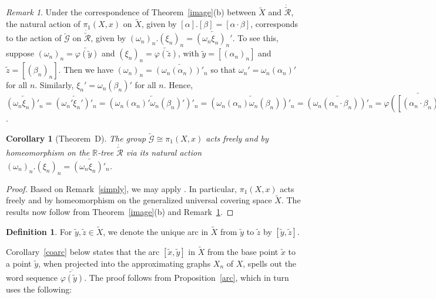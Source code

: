 \documentclass{amsart}
\newtheorem{corollary}[theorem]{Corollary}
\theoremstyle{definition}
\newtheorem{definition}[theorem]{Definition}
\theoremstyle{remark}
\newtheorem{remark}[theorem]{Remark}
\numberwithin{equation}{section}
\begin{document}
\begin{remark} \label{action} Under the correspondence of Theorem~\ref{image}(b) between $\tilde{X}$ and $\dot{\overleftarrow{\mathcal R}}$, the natural action of $\pi_1(X,x)$ on $\tilde{X}$, given  by $[\alpha].[\beta]=[\alpha\cdot\beta]$, corresponds to the action of $\overleftarrow{\mathcal G}$ on $\dot{\overleftarrow{\mathcal R}}$, given by $(\omega_n)_n.(\xi_n)_n=\overleftarrow{(\omega_n\xi_n)_n'}$. To see this, suppose $(\omega_n)_n=\overleftarrow{\varphi(\tilde{y})}$ and $(\xi_n)_n=\overleftarrow{\varphi(\tilde{z})}$, with $\tilde{y}=[(\alpha_n)_n]$ and $\tilde{z}=[(\beta_n)_n]$. Then  we have $(\omega_n)_n=\overleftarrow{(\omega_n(\alpha_n))'_n}$ so that $\omega_n'=\omega_n(\alpha_n)'$ for all $n$.
Similarly, $\xi_n'=\omega_n(\beta_n)'$ for all $n$. Hence, $\overleftarrow{(\omega_n\xi_n)'_n}=\overleftarrow{(\omega_n'\xi_n')'_n}=\overleftarrow{(\omega_n(\alpha_n)'\omega_n(\beta_n)')'_n}=
\overleftarrow{(\omega_n(\alpha_n)\omega_n(\beta_n))'_n}=\overleftarrow{(\omega_n(\alpha_n\cdot \beta_n))'_n}=\overleftarrow{\varphi([(\alpha_n\cdot\beta_n)_n])}
=\overleftarrow{\varphi([(\alpha_n)_n].[(\beta_n)_n])}
=\overleftarrow{\varphi(\tilde{y}.\tilde{z})}$.
\end{remark}

\begin{corollary}[Theorem~D]\label{ThmD}
The group $\overleftarrow{\mathcal G}\cong \pi_1(X,x)$ acts freely and by homeomorphism on the $\mathbb{R}$-tree $\dot{\overleftarrow{\mathcal R}}$ via its natural action $(\omega_n)_n.(\xi_n)_n=\overleftarrow{(\omega_n \xi_n)'_n}$.
\end{corollary}

\begin{proof} Based on Remark~\ref{simply}, we may apply \cite[Theorem~4.10]{FZ2}. In particular, $\pi_1(X,x)$ acts freely and by homeomorphism on the generalized universal covering space $\tilde{X}$. The results now follow from Theorem~\ref{image}(b) and Remark~\ref{action}.\end{proof}

\begin{definition} For $\tilde{y},\tilde{z}\in \tilde{X}$, we denote   the unique arc in $\tilde{X}$ from $\tilde{y}$ to $\tilde{z}$ by $[\tilde{y},\tilde{z}]$.
\end{definition}

Corollary~\ref{coarc} below states that the arc $[\tilde{x},\tilde{y}]$ in $\tilde{X}$ from the base point $\tilde{x}$  to a point $\tilde{y}$, when projected into the approximating graphs $X_n$ of $X$, spells out the word sequence $\overline{\overleftarrow{\varphi(\tilde{y})}}$. The proof follows from Proposition~\ref{arc}, which in turn uses the following:
\end{document}
